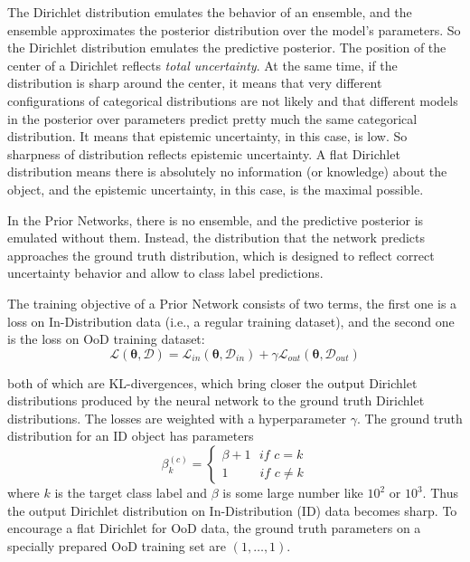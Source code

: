 \documentclass{article}
\begin{document}
The Dirichlet distribution emulates the behavior of an ensemble, and the ensemble approximates the posterior distribution over the model's parameters.
So the Dirichlet distribution emulates the predictive posterior.
The position of the center of a Dirichlet reflects \textit{total uncertainty}.
At the same time, if the distribution is sharp around the center, it means that very different configurations of categorical distributions are not likely and that different models in the posterior over parameters predict pretty much the same categorical distribution.
It means that epistemic uncertainty, in this case, is low.
So sharpness of distribution reflects epistemic uncertainty. A flat Dirichlet distribution means there is absolutely no information (or knowledge) about the object, and the epistemic uncertainty, in this case, is the maximal possible.

In the Prior Networks, there is no ensemble, and the predictive posterior is emulated without them.
Instead, the distribution that the network predicts approaches the ground truth distribution, which is designed to reflect correct uncertainty behavior and allow to class label predictions.

The training objective of a Prior Network consists of two terms, the first one is a loss on In-Distribution data (i.e., a regular training dataset), and the second one is the loss on OoD training dataset:
\begin{equation}
\mathcal{L}(\boldsymbol{\theta}, \mathcal{D}) = \mathcal{L}_{in}(\boldsymbol{\theta}, \mathcal{D}_{in}) + \gamma \mathcal{L}_{out}(\boldsymbol{\theta}, \mathcal{D}_{out})
\end{equation}

both of which are KL-divergences, which bring closer the output Dirichlet distributions produced by the neural network to the ground truth Dirichlet distributions.
The losses are weighted with a hyperparameter $\gamma$.
The ground truth distribution for an ID object has parameters
\begin{equation}
\beta_k^{(c)} = \begin{cases}
\beta + 1 \,\,\,\,               if \,\, c = k \\
1 \,\,\,\,\,\,\,\,\,\,\,\,\,\,\, if \,\, c \neq k
\end{cases}
\end{equation}
where $k$ is the target class label and $\beta$ is some large number like $10^2$ or $10^3$. Thus the output Dirichlet distribution on In-Distribution (ID) data becomes sharp.
To encourage a flat Dirichlet for OoD data, the ground truth parameters on a specially prepared OoD training set are $(1, \dots, 1)$.
\end{document}
